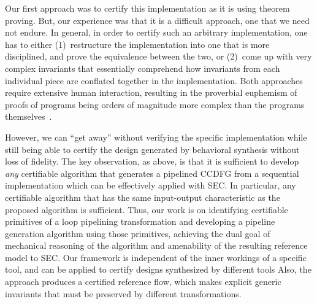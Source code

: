 Our first approach was to certify this implementation as it is using theorem proving. 
But, our experience was that it is a difficult approach, one that we need not endure. 
In general, in order to certify such an arbitrary implementation,
one has to either (1)~restructure the implementation into
one that is more disciplined, and prove the equivalence
between the two, or (2)~come up with very complex
invariants that essentially comprehend how invariants from
each individual piece are conflated together in the
implementation.  Both approaches require extensive human
interaction, resulting in the proverbial euphemism of proofs
of programs being orders of magnitude more complex than the
programs themselves~\cite{liu}.

However, we can ``get away'' without verifying
the specific implementation while still being able to
certify the design generated by behavioral synthesis without
loss of fidelity. The key observation, as above, is that it
is sufficient to develop {\em any} certifiable algorithm
that generates a pipelined CCDFG from a sequential
implementation which can be effectively applied with SEC.
In particular, any certifiable algorithm that has the same
input-output characteristic as the proposed algorithm
is sufficient.  Thus, our work is on identifying
certifiable primitives of a loop pipelining
transformation and developing a pipeline generation
algorithm using those primitives, achieving the dual goal of
mechanical reasoning of the algorithm and amenability of the
resulting reference model to SEC. Our framework is independent of the inner workings of a specific tool, 
and can be applied to certify designs synthesized by different tools 
Also, the approach produces a certified reference flow, 
which makes explicit generic invariants that must be preserved by different transformations. 







